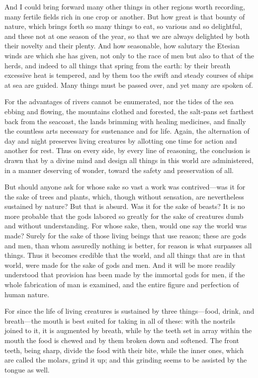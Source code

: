  And I could bring forward many other things in other regions worth recording, many fertile fields rich in one crop or another. But how great is that bounty of nature, which brings forth so many things to eat, so various and so delightful, and these not at one season of the year, so that we are always delighted by both their novelty and their plenty. And how seasonable, how salutary the Etesian winds are which she has given, not only to the race of men but also to that of the herds, and indeed to all things that spring from the earth: by their breath excessive heat is tempered, and by them too the swift and steady courses of ships at sea are guided. Many things must be passed over, and yet many are spoken of.

 For the advantages of rivers cannot be enumerated, nor the tides of the sea ebbing and flowing, the mountains clothed and forested, the salt-pans set farthest back from the seacoast, the lands brimming with healing medicines, and finally the countless arts necessary for sustenance and for life. Again, the alternation of day and night preserves living creatures by allotting one time for action and another for rest. Thus on every side, by every line of reasoning, the conclusion is drawn that by a divine mind and design all things in this world are administered, in a manner deserving of wonder, toward the safety and preservation of all.

 But should anyone ask for whose sake so vast a work was contrived—was it for the sake of trees and plants, which, though without sensation, are nevertheless sustained by nature? But that is absurd. Was it for the sake of beasts? It is no more probable that the gods labored so greatly for the sake of creatures dumb and without understanding. For whose sake, then, would one say the world was made? Surely for the sake of those living beings that use reason; these are gods and men, than whom assuredly nothing is better, for reason is what surpasses all things. Thus it becomes credible that the world, and all things that are in that world, were made for the sake of gods and men. And it will be more readily understood that provision has been made by the immortal gods for men, if the whole fabrication of man is examined, and the entire figure and perfection of human nature.

 For since the life of living creatures is sustained by three things—food, drink, and breath—the mouth is best suited for taking in all of these: with the nostrils joined to it, it is augmented by breath, while by the teeth set in array within the mouth the food is chewed and by them broken down and softened. The front teeth, being sharp, divide the food with their bite, while the inner ones, which are called the molars, grind it up; and this grinding seems to be assisted by the tongue as well.

